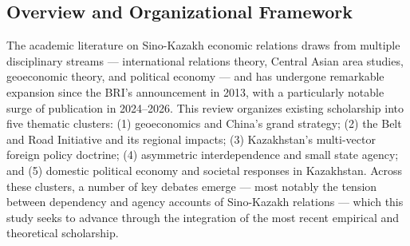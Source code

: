 \documentclass[12pt]{article}
\begin{document}
\subsection{Overview and Organizational Framework}
The academic literature on Sino-Kazakh economic relations draws from multiple disciplinary streams --- international relations theory, Central Asian area studies, geoeconomic theory, and political economy --- and has undergone remarkable expansion since the BRI's announcement in 2013, with a particularly notable surge of publication in 2024--2026. This review organizes existing scholarship into five thematic clusters: (1) geoeconomics and China's grand strategy; (2) the Belt and Road Initiative and its regional impacts; (3) Kazakhstan's multi-vector foreign policy doctrine; (4) asymmetric interdependence and small state agency; and (5) domestic political economy and societal responses in Kazakhstan. Across these clusters, a number of key debates emerge --- most notably the tension between dependency and agency accounts of Sino-Kazakh relations --- which this study seeks to advance through the integration of the most recent empirical and theoretical scholarship.\par
\end{document}
